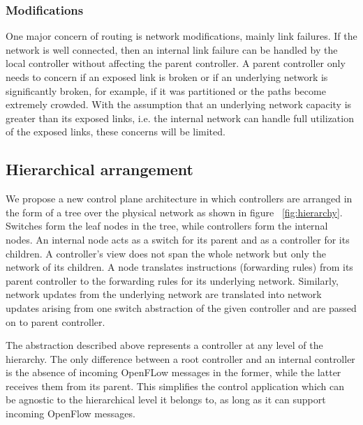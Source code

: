 \documentclass[10pt, twocolumn]{article}
\begin{document}
\subsubsection{Modifications}
One major concern of routing is network modifications, mainly link failures. If the network is well connected, then an internal link failure can be handled by the local controller without affecting the parent controller. A parent controller only needs to concern if an exposed link is broken or if an underlying network is significantly broken, for example, if it was partitioned or the paths become extremely crowded. With the assumption that an underlying network capacity is greater than its exposed links, i.e. the internal network can handle full utilization of the exposed links, these concerns will be limited.

\subsection{Hierarchical arrangement}
We propose a new control plane architecture in which controllers are arranged in the form of a tree over the physical network as shown in figure ~\ref{fig:hierarchy}. Switches form the leaf nodes in the tree, while controllers form the internal nodes. An internal node acts as a switch for its parent and as a controller for its children. A controller's view does not span the whole network but only the network of its children. A node translates instructions (forwarding rules) from its parent controller to the forwarding rules for its underlying network. Similarly, network updates from the underlying network are translated into network updates arising from one switch abstraction of the given controller and are passed on to parent controller.

The abstraction described above represents a controller at any level of the hierarchy. The only difference between a root controller and an internal controller is the absence of incoming OpenFLow messages in the former, while the latter receives them from its parent. This simplifies the control application which can be agnostic to the hierarchical level it belongs to, as long as it can support incoming OpenFlow messages.
\end{document}
